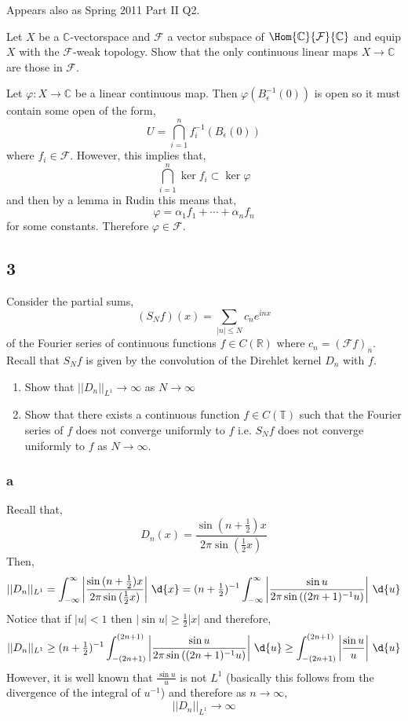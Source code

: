 \documentclass[12pt]{article}
\newcommand{\R}{\mathbb{R}}
\renewcommand{\C}{\mathbb{C}}
\renewcommand{\T}{\mathbb{T}}
\renewcommand{\F}{\mathcal{F}}
\begin{document}
Appears also as Spring 2011 Part II Q2. 

\begin{exercise}
Let $X$ be a $\C$-vectorspace and $\F$ a vector subspace of $\Hom{\C}{\F}{\C}$ and equip $X$ with the $\F$-weak topology. Show that the only continuous linear maps $X \to \C$ are those in $\F$.
\end{exercise}

Let $\varphi : X \to \C$ be a linear continuous map. Then $\varphi(B_\epsilon^{-1}(0))$ is open so it must contain some open of the form,
\[ U = \bigcap_{i = 1}^n f_i^{-1}(B_\epsilon(0)) \]
where $f_i \in \F$. However, this implies that,
\[ \bigcap_{i = 1}^n \ker{f_i} \subset \ker{\varphi} \]
and then by a lemma in Rudin this means that,
\[ \varphi = \alpha_1 f_1 + \cdots + \alpha_n f_n \]
for some constants. Therefore $\varphi \in \F$.

\subsection{3}

\begin{exercise}
Consider the partial sums,
\[ (S_N f)(x) = \sum_{|n| \le N} c_n e^{inx} \]
of the Fourier series of continuous functions $f \in C(\R)$ where $c_n = (\F f)_n$. Recall that $S_N f$ is given by the convolution of the Direhlet kernel $D_n$ with $f$.
\begin{enumerate}
\item Show that $|| D_n ||_{L^1} \to \infty$ as $N \to \infty$ 
\item Show that there exists a continuous function $f \in C(\T)$ such that the Fourier series of $f$ does not converge uniformly to $f$ i.e. $S_N f$ does not converge uniformly to $f$ as $N \to \infty$.
\end{enumerate}
\end{exercise}

\subsubsection{a}

Recall that,
\[ D_n(x) = \frac{\sin{(n + \tfrac{1}{2}) x}}{2 \pi \sin{(\tfrac{1}{2} x)}} \]
Then,
\[ || D_n ||_{L^1} = \int_{-\infty}^\infty \left| \frac{\sin{(n + \tfrac{1}{2}) x}}{2 \pi \sin{(\tfrac{1}{2} x)}} \right| \, \d{x} = (n + \tfrac{1}{2})^{-1} \int_{-\infty}^{\infty} \left| \frac{\sin{u}}{2 \pi \sin{\left( (2 n + 1)^{-1} u \right)}} \right| \, \d{u}  \]
Notice that if $|u| < 1$ then $|\sin{u}| \ge \tfrac{1}{2} |x|$ and therefore,
\[ || D_n ||_{L^1} \ge  (n + \tfrac{1}{2})^{-1} \int_{-(2 n + 1)}^{(2 n + 1)} \left| \frac{\sin{u}}{2 \pi \sin{\left( (2 n + 1)^{-1} u \right)}} \right| \, \d{u} \ge \int_{-(2 n + 1)}^{(2n + 1)} \left| \frac{\sin{u}}{u} \right| \, \d{u}  \]
However, it is well known that $\frac{\sin{u}}{u}$ is not $L^1$ (basically this follows from the divergence of the integral of $u^{-1}$) and therefore as $n \to \infty$,
\[ || D_n ||_{L^1} \to \infty \]
\end{document}
